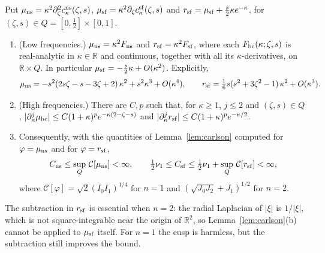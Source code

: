 \begin{lemma}\label{lem:corr}
Put $\mu_{\rm ns}=\kappa^2\partial_\zeta^2c^{\rm ns}_\kappa(\zeta,s)$, $\mu_{\rm sf}=\kappa^2\partial_\zeta c^{\rm sf}_\kappa(\zeta,s)$
and $r_{\rm sf}=\mu_{\rm sf}+\frac s2\kappa e^{-\kappa}$, for $(\zeta,s)\in Q=[0,\frac12]\times[0,1]$.
\begin{enumerate}
\item[(i)] (Low frequencies.) $\mu_{\rm ns}=\kappa^2F_{\rm ns}$ and $r_{\rm sf}=\kappa^2F_{\rm sf}$, where each
$F_{\rm bc}(\kappa;\zeta,s)$ is real-analytic in $\kappa\in\mathbb R$ and continuous, together with all its
$\kappa$-derivatives, on $\mathbb R\times Q$. In particular $\mu_{\rm sf}=-\frac s2\kappa+O(\kappa^2)$. Explicitly,
\[
\mu_{\rm ns}=-s^2(2s\zeta-s-3\zeta+2)\,\kappa^2+s^2\kappa^3+O(\kappa^4),\qquad
r_{\rm sf}=\tfrac16s(s^2+3\zeta^2-1)\,\kappa^2+O(\kappa^3).
\]
\item[(ii)] (High frequencies.) There are $C,p$ such that, for $\kappa\ge1$, $j\le2$ and $(\zeta,s)\in Q$,
$|\partial_\kappa^j\mu_{\rm bc}|\le C(1+\kappa)^pe^{-\kappa(2-\zeta-s)}$ and $|\partial_\kappa^jr_{\rm sf}|\le
C(1+\kappa)^pe^{-\kappa/2}$.
\item[(iii)] Consequently, with the quantities of Lemma~\ref{lem:carlson} computed for $\varphi=\mu_{\rm ns}$
and for $\varphi=r_{\rm sf}$,
\[
C_{\rm ns}\le\sup_Q\,\mathcal C[\mu_{\rm ns}]<\infty,\qquad
\tfrac12\nu_1\le C_{\rm sf}\le\tfrac12\nu_1+\sup_Q\,\mathcal C[r_{\rm sf}]<\infty,
\]
where $\mathcal C[\varphi]=\sqrt2(I_0I_1)^{1/4}$ for $n=1$ and $(\sqrt{J_0J_2}+J_1)^{1/2}$ for $n=2$.
\end{enumerate}
\end{lemma}

The subtraction in $r_{\rm sf}$ is essential when $n=2$: the radial Laplacian of $|\xi|$ is $1/|\xi|$, which is
not square-integrable near the origin of $\mathbb R^2$, so Lemma~\ref{lem:carlson}(b) cannot be applied to
$\mu_{\rm sf}$ itself. For $n=1$ the cusp is harmless, but the subtraction still improves the bound.

